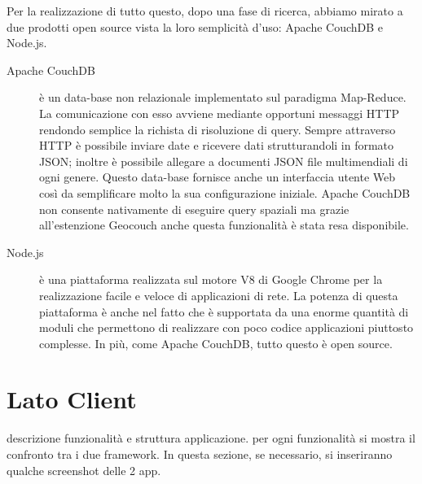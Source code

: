 		Per la realizzazione di tutto questo, dopo una fase di ricerca, abbiamo
		mirato a due prodotti open source vista la loro semplicità d'uso:
		Apache CouchDB\texttrademark{} e Node.js.
		\begin{description}
			\item[Apache CouchDB\texttrademark{}] è un data-base non relazionale
				implementato sul paradigma Map-Reduce. La comunicazione con esso
				avviene mediante opportuni messaggi HTTP rendondo semplice la
				richista di risoluzione di query. Sempre attraverso HTTP è
				possibile inviare date e ricevere dati strutturandoli in
				formato JSON; inoltre è possibile allegare a documenti JSON
				file multimendiali di ogni genere. Questo data-base fornisce
				anche un interfaccia utente Web così da semplificare molto la
				sua configurazione iniziale. Apache CouchDB\texttrademark{} non
				consente nativamente di eseguire query spaziali ma grazie
				all'estenzione Geocouch anche questa funzionalità è stata resa
				disponibile.
			\item[Node.js] è una piattaforma realizzata sul motore \js{} V8 di
				Google Chrome per la realizzazione facile e veloce di
				applicazioni di rete. La potenza di questa piattaforma è anche
				nel fatto che è supportata da una enorme quantità di moduli
				che permettono di realizzare con poco codice applicazioni piuttosto
				complesse. In più, come Apache CouchDB\texttrademark{}, tutto 
				questo è open source.
		\end{description}
		
		
	
	\section{Lato Client}
		descrizione funzionalità e struttura applicazione. per ogni funzionalità
		si mostra il confronto tra i due framework. In questa sezione, se 
		necessario, si inseriranno qualche screenshot delle 2 app.
